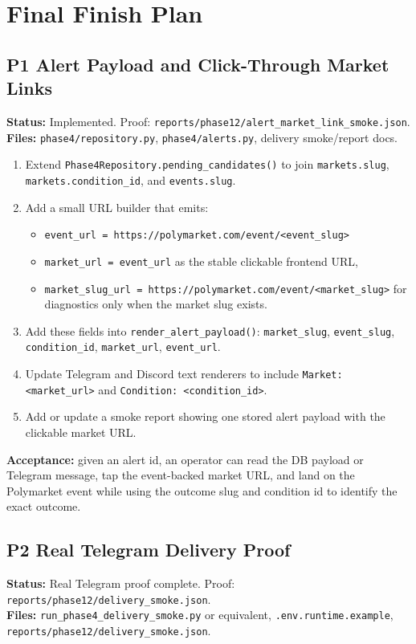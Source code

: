 \documentclass{article}
\begin{document}
\section*{Final Finish Plan}
\subsection*{P1 Alert Payload and Click-Through Market Links}
\textbf{Status:} Implemented. Proof: \texttt{reports/phase12/alert\_market\_link\_smoke.json}.\\
\textbf{Files:} \texttt{phase4/repository.py}, \texttt{phase4/alerts.py}, delivery smoke/report docs.

\begin{enumerate}[nosep]
\item Extend \texttt{Phase4Repository.pending\_candidates()} to join \texttt{markets.slug}, \texttt{markets.condition\_id}, and \texttt{events.slug}.
\item Add a small URL builder that emits:
\begin{itemize}[nosep]
\item \texttt{event\_url = https://polymarket.com/event/<event\_slug>}
\item \texttt{market\_url = event\_url} as the stable clickable frontend URL,
\item \texttt{market\_slug\_url = https://polymarket.com/event/<market\_slug>} for diagnostics only when the market slug exists.
\end{itemize}
\item Add these fields into \texttt{render\_alert\_payload()}: \texttt{market\_slug}, \texttt{event\_slug}, \texttt{condition\_id}, \texttt{market\_url}, \texttt{event\_url}.
\item Update Telegram and Discord text renderers to include \texttt{Market: <market\_url>} and \texttt{Condition: <condition\_id>}.
\item Add or update a smoke report showing one stored alert payload with the clickable market URL.
\end{enumerate}

\textbf{Acceptance:} given an alert id, an operator can read the DB payload or Telegram message, tap the event-backed market URL, and land on the Polymarket event while using the outcome slug and condition id to identify the exact outcome.

\subsection*{P2 Real Telegram Delivery Proof}
\textbf{Status:} Real Telegram proof complete. Proof: \texttt{reports/phase12/delivery\_smoke.json}.\\
\textbf{Files:} \texttt{run\_phase4\_delivery\_smoke.py} or equivalent, \texttt{.env.runtime.example}, \texttt{reports/phase12/delivery\_smoke.json}.
\end{document}

